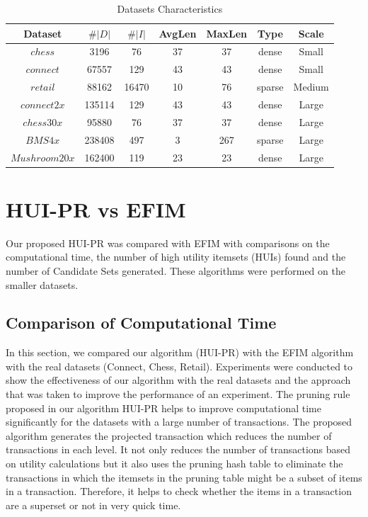 \documentclass[11pt,openright]{report}
\begin{document}
\begin{table}[!htbp]
	\renewcommand{\arraystretch}{1.3}
	\caption{Datasets Characteristics}
	\label{dataset_table}
	\centering
	\begin{tabular}{|c||c|c|c|c|c|c|}
		\hline
		\bfseries Dataset & \bfseries $\#|D|$ & \bfseries $\#|I|$ & \bfseries AvgLen & \bfseries MaxLen & \bfseries Type & \bfseries Scale\\
		\hline\hline
		$chess$ & 3196 & 76 & 37 & 37 & dense & Small\\ \hline
		$connect$ & 67557 & 129 & 43 & 43 & dense & Small\\ \hline
		$retail$ & 88162 & 16470 & 10 & 76 & sparse & Medium \\ \hline
		$connect2x$ & 135114 & 129 & 43 & 43 & dense & Large\\ \hline
		$chess30x$ & 95880 & 76 & 37 & 37 & dense & Large\\ \hline
		$BMS4x$ & 238408 & 497 & 3 & 267 & sparse & Large \\ \hline
		$Mushroom20x$ & 162400 & 119 & 23 & 23 & dense & Large\\ \hline
	\end{tabular}
\end{table}

\section{HUI-PR vs EFIM}
Our proposed HUI-PR was compared with EFIM \cite{Zida2015} with comparisons on the computational time, the number of high utility itemsets (HUIs) found and the number of Candidate Sets generated. These algorithms were performed on the smaller datasets.

\subsection{Comparison of Computational Time}
In this section, we compared our algorithm (HUI-PR) with the EFIM algorithm \cite{Zida2015} with the real datasets (Connect, Chess, Retail). Experiments were conducted to show the effectiveness of our algorithm with the real datasets and the approach that was taken to improve the performance of an experiment. The pruning rule proposed in our algorithm HUI-PR helps to improve computational time significantly for the datasets with a large number of transactions. The proposed algorithm generates the projected transaction which reduces the number of transactions in each level. It not only reduces the number of transactions based on utility calculations but it also uses the pruning hash table to eliminate the transactions in which the itemsets in the pruning table might be a subset of items in a transaction. Therefore, it helps to check whether the items in a transaction are a superset or not in very quick time.
\end{document}
